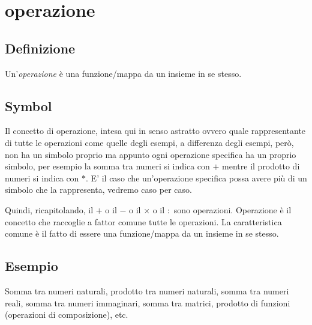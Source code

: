 \chapter{operazione}
\section{Definizione}
Un'\textit{operazione} è una funzione/mappa da un insieme in se stesso. 

\section{Symbol}
Il concetto di operazione, intesa qui in senso astratto ovvero quale rappresentante di tutte le operazioni come quelle degli esempi, a differenza degli esempi, però, non ha un simbolo proprio ma appunto
ogni operazione specifica ha un proprio simbolo, per esempio la somma tra numeri si indica con $+$ mentre il prodotto di numeri si indica con $*$. E' il caso che un'operazione
specifica possa avere più di un simbolo che la rappresenta, vedremo caso per caso.

Quindi, ricapitolando, il $+$ o il $-$ o il $\times$ o il $:$ sono operazioni. Operazione è il concetto che raccoglie a fattor comune tutte le operazioni. La caratteristica comune
è il fatto di essere una funzione/mappa da un insieme in se stesso.

\section{Esempio}
Somma tra numeri naturali, prodotto tra numeri naturali, somma tra numeri reali, somma tra numeri immaginari, somma tra matrici, prodotto di funzioni (operazioni di composizione), etc.


